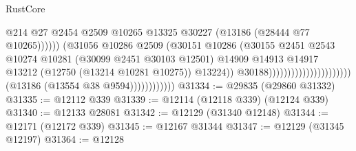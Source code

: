 \begin{lexlean}{RustCore}
\begin{coremodule}
                                                                          @214
                                                                          @27
                                                                          @2454
                                                                          @2509
                                                                          @10265
                                                                          @13325
                                                                          @30227
                                                                          (@13186
                                                                            (@28444 @77 @10265))))))
                                                                  (@31056
                                                                    @10286
                                                                    @2509
                                                                    (@30151
                                                                      @10286
                                                                      (@30155
                                                                        @2451
                                                                        @2543
                                                                        @10274
                                                                        @10281
                                                                        (@30099 @2451 @30103 @12501)
                                                                        @14909
                                                                        @14913
                                                                        @14917
                                                                        @13212
                                                                        (@12750
                                                                          (@13214 @10281 @10275))
                                                                        @13224))
                                                                    @30188))))))))))))))))))))))
                        (@13186 (@13554 @38 @9594))))))))))))
@31334 := @29835 (@29860 @31332)
@31335 := @12112 @339
@31339 := @12114 (@12118 @339) (@12124 @339)
@31340 := @12133 @28081
@31342 := @12129 (@31340 @12148)
@31344 := @12171 (@12172 @339)
@31345 := @12167 @31344
@31347 := @12129 (@31345 @12197)
@31364 := @12128

\end{coremodule}
\end{lexlean}

